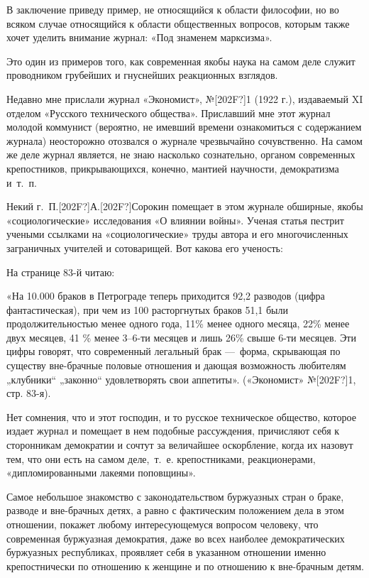 В заключение приведу пример, не относящийся к области философии, но во
всяком случае относящийся к области общественных вопросов, которым также
хочет уделить внимание журнал: «Под знаменем марксизма».

Это один из примеров того, как современная якобы наука на самом деле служит
проводником грубейших и гнуснейших реакционных взглядов.

Недавно мне прислали журнал «Экономист», №\textlatin{[202F?]}1 (1922 г.),
издаваемый XI отделом «Русского технического общества». Приславший мне этот
журнал молодой коммунист (вероятно, не имевший времени ознакомиться с
содержанием журнала) неосторожно отозвался о журнале чрезвычайно
сочувственно. На самом же деле журнал является, не знаю насколько
сознательно, органом современных крепостников, прикрывающихся, конечно,
мантией научности, демократизма и~т.~п.

Некий г.~П.\textlatin{[202F?]}А.\textlatin{[202F?]}Сорокин помещает в этом
журнале обширные, якобы «социологические» исследования «О влиянии войны».
Ученая статья пестрит учеными ссылками на «социологические» труды автора и
его многочисленных заграничных учителей и сотоварищей. Вот какова его
ученость:

На странице 83-й читаю:

«На 10.000 браков в Петрограде теперь приходится 92,2 разводов (цифра
фантастическая), при чем из 100 расторгнутых браков 51,1 были
продолжительностью менее одного года, 11\% менее одного месяца, 22\% менее
двух месяцев, 41 \% менее 3–6-ти месяцев и лишь 26\% свыше 6-ти месяцев.
Эти цифры говорят, что современный легальный брак —~форма, скрывающая по
существу вне-брачные половые отношения и дающая возможность любителям
„клубники“ „законно“ удовлетворять свои аппетиты». («Экономист»
№\textlatin{[202F?]}1, стр. 83-я).

Нет сомнения, что и этот господин, и то русское техническое общество,
которое издает журнал и помещает в нем подобные рассуждения, причисляют
себя к сторонникам демократии и сочтут за величайшее оскорбление, когда их
назовут тем, что они есть на самом деле,~т.~е. крепостниками,
реакционерами, «дипломированными лакеями поповщины».

Самое небольшое знакомство с законодательством буржуазных стран о браке,
разводе и вне-брачных детях, а равно с фактическим положением дела в этом
отношении, покажет любому интересующемуся вопросом человеку, что
современная буржуазная демократия, даже во всех наиболее демократических
буржуазных республиках, проявляет себя в указанном отношении именно
крепостнически по отношению к женщине и по отношению к вне-брачным детям.

